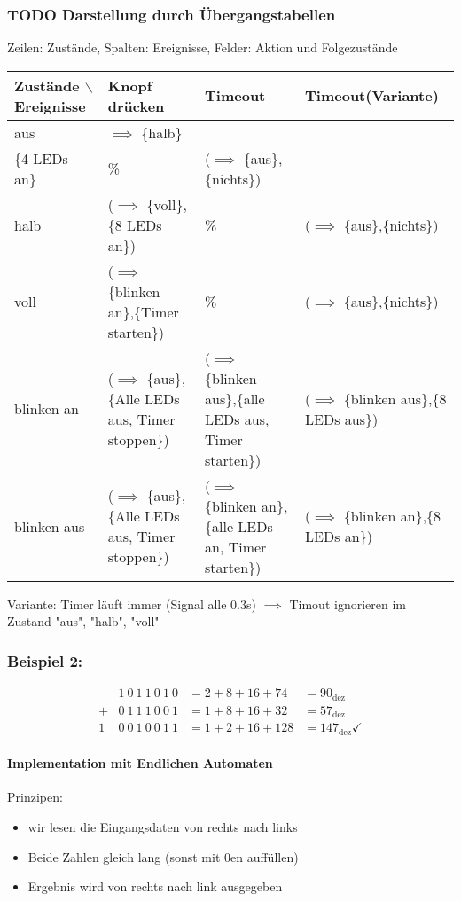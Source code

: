\documentclass[a4paper]{scrartcl}
\theoremstyle{definition}
\theoremstyle{plain}
\theoremstyle{remark}
\theoremstyle{remark}
\begin{document}
\subsubsection{{\bfseries\sffamily TODO} Darstellung durch Übergangstabellen}
\label{sec-3-3-2}
Zeilen: Zustände, Spalten: Ereignisse, Felder: Aktion und Folgezustände
\begin{center}
\begin{tabular}{llll}
Zustände $\backslash$ Ereignisse & Knopf drücken & Timeout & Timeout(Variante)\\
\hline
aus & $\implies$ \{halb\} \\ \{4 LEDs an\} & \% & ($\implies$ \{aus\},\{nichts\})\\
halb & ($\implies$ \{voll\},\{8 LEDs an\}) & \% & ($\implies$ \{aus\},\{nichts\})\\
voll & ($\implies$ \{blinken an\},\{Timer starten\}) & \% & ($\implies$ \{aus\},\{nichts\})\\
blinken an & ($\implies$ \{aus\},\{Alle LEDs aus, Timer stoppen\}) & ($\implies$ \{blinken aus\},\{alle LEDs aus, Timer starten\}) & ($\implies$ \{blinken aus\},\{8 LEDs aus\})\\
blinken aus & ($\implies$ \{aus\},\{Alle LEDs aus, Timer stoppen\}) & ($\implies$ \{blinken an\},\{alle LEDs an, Timer starten\}) & ($\implies$ \{blinken an\},\{8 LEDs an\})\\
\end{tabular}
\end{center}

Variante: Timer läuft immer (Signal alle 0.3s) $\implies$ Timout ignorieren im Zustand "aus", "halb", "voll"
\subsubsection{Beispiel 2:}
\label{sec-3-3-3}
\begin{align}
&1~0~1~1~0~1~0 &= 2 + 8 + 16 + 74 &= 90_{\text{dez}} \\
+&0~1~1~1~0~0~1 &= 1 + 8 + 16 + 32 &= 57_{\text{dez}} \\
\hline
1~&0~0~1~0~0~1~1 &= 1 + 2 + 16 + 128 &= 147_{\text{dez}}\checkmark
\end{align}
\paragraph{Implementation mit Endlichen Automaten}
\label{sec-3-3-3-1}
Prinzipen:
\begin{itemize}
\item wir lesen die Eingangsdaten von rechts nach links
\item Beide Zahlen gleich lang (sonst mit 0en auffüllen)
\item Ergebnis wird von rechts nach link ausgegeben
\end{itemize}
\end{document}

